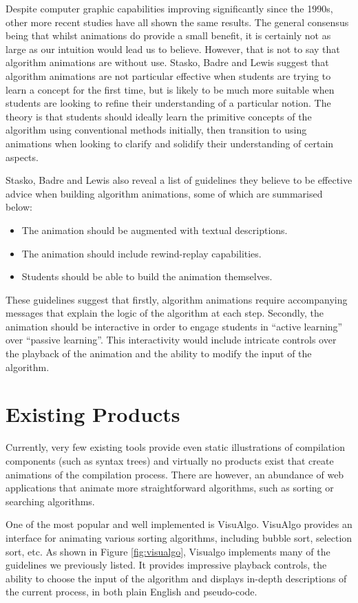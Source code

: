 \documentclass{l4proj}
\begin{document}
Despite computer graphic capabilities improving significantly since the 1990s, other more recent studies have all shown the same results. The general consensus being that whilst animations do provide a small benefit, it is certainly not as large as our intuition would lead us to believe. However, that is not to say that algorithm animations are without use. Stasko, Badre and Lewis suggest that algorithm animations are not particular effective when students are trying to learn a concept for the first time, but is likely to be much more suitable when students are looking to refine their understanding of a particular notion. The theory is that students should ideally learn the primitive concepts of the algorithm using conventional methods initially, then transition to using animations when looking to clarify and solidify their understanding of certain aspects.

Stasko, Badre and Lewis also reveal a list of guidelines they believe to be effective advice when building algorithm animations, some of which are summarised below:
\begin{itemize}
\item The animation should be augmented with textual descriptions.
\item The animation should include rewind-replay capabilities.
\item Students should be able to build the animation themselves.
\end{itemize}
These guidelines suggest that firstly, algorithm animations require accompanying messages that explain the logic of the algorithm at each step. Secondly, the animation should be interactive in order to engage students in ``active learning'' over ``passive learning''. This interactivity would include intricate controls over the playback of the animation and the ability to modify the input of the algorithm.

\section{Existing Products}
Currently, very few existing tools provide even static illustrations of compilation components (such as syntax trees) and virtually no products exist that create animations of the compilation process. There are however, an abundance of web applications that animate more straightforward algorithms, such as sorting or searching algorithms. 

One of the most popular and well implemented is VisuAlgo\cite{visualgo}. VisuAlgo provides an interface for animating various sorting algorithms, including bubble sort, selection sort, etc. As shown in Figure \ref{fig:visualgo}, Visualgo implements many of the guidelines we previously listed. It provides impressive playback controls, the ability to choose the input of the algorithm and displays in-depth descriptions of the current process, in both plain English and pseudo-code. 
\end{document}
